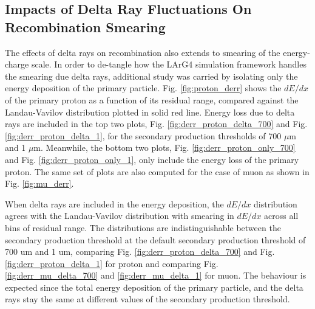 \subsection{Impacts of Delta Ray Fluctuations On Recombination Smearing}
\label{sec:impactDeltaRaySmear}

The effects of delta rays on recombination also extends to smearing of the energy-charge scale.
In order to de-tangle how the LArG4 simulation framework handles the smearing due delta rays, additional study was carried by isolating only the energy deposition of the primary particle.
Fig. \ref{fig:proton_derr} shows the $dE/dx$ of the primary proton as a function of its residual range, compared against the Landau-Vavilov distribution \cite{} plotted in solid red line.
Energy loss due to delta rays are included in the top two plots, Fig. \ref{fig:derr_proton_delta_700} and Fig. \ref{fig:derr_proton_delta_1}, for the secondary production thresholds of 700 $\mu$m and 1 $\mu$m.
Meanwhile, the bottom two plots, Fig. \ref{fig:derr_proton_only_700} and Fig. \ref{fig:derr_proton_only_1}, only include the energy loss of the primary proton.
The same set of plots are also computed for the case of muon as shown in Fig. \ref{fig:mu_derr}.

When delta rays are included in the energy deposition, the $dE/dx$ distribution agrees with the Landau-Vavilov distribution with smearing in $dE/dx$ across all bins of residual range.
The distributions are indistinguishable between the secondary production threshold at the default secondary production threshold of 700 um and 1 um, comparing Fig. \ref{fig:derr_proton_delta_700} and Fig. \ref{fig:derr_proton_delta_1} for proton and comparing Fig. \ref{fig:derr_mu_delta_700} and \ref{fig:derr_mu_delta_1} for muon. 
The behaviour is expected since the total energy deposition of the primary particle, and the delta rays stay the same at different values of the secondary production threshold.


